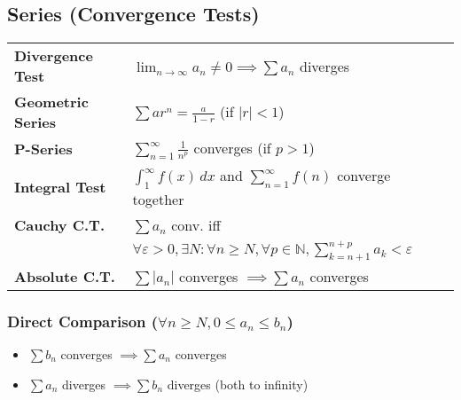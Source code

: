 \documentclass[a4paper,landscape]{article}
\begin{document}
\fontsize{12.5}{15}\selectfont

\begin{multicols}{2}

\setlength{\premulticols}{1pt}
\setlength{\postmulticols}{1pt}
\setlength{\multicolsep}{1pt}
\setlength{\columnsep}{1pt}

\setlength{\abovedisplayskip}{0pt}
\setlength{\belowdisplayskip}{0pt}

\section{Series (Convergence Tests)}

\renewcommand{\arraystretch}{1.5} %


\begin{tabular}{@{}ll@{}l@{}}
\textbf{Divergence Test} & $\displaystyle\lim_{n\to\infty} a_n \neq 0 \implies \sum a_n$ diverges \\
\textbf{Geometric Series} & $\displaystyle\sum ar^n = \frac{a}{1-r}$ (if $|r|<1$) \\
\textbf{P-Series} & $\displaystyle\sum_{n=1}^{\infty} \frac{1}{n^p}$ converges (if $p>1$) \\
\textbf{Integral Test} & $\displaystyle\int_{1}^{\infty} f(x) \, dx$ and $\displaystyle\sum_{n=1}^{\infty} f(n)$ converge together \\
\textbf{Cauchy C.T.} & $\displaystyle\sum a_n$ conv. iff \\
& $\forall \varepsilon > 0, \exists N: \forall n \geq N, \forall p \in \mathbb{N}, \sum_{k=n+1}^{n+p} a_k < \varepsilon$ \\
\textbf{Absolute C.T.} & $\sum |a_n|$ converges $\implies \sum a_n$ converges \\
\end{tabular}

\subsubsection{Direct Comparison ({\small$\forall n \geq N, 0 \leq a_n \leq b_n$}) }
\begin{itemize}

\item $\sum b_n$ converges $\implies \sum a_n$ converges
\item $\sum a_n$ diverges $\implies \sum b_n$ diverges (both to infinity)
\end{itemize}


\end{multicols}
\end{document}
